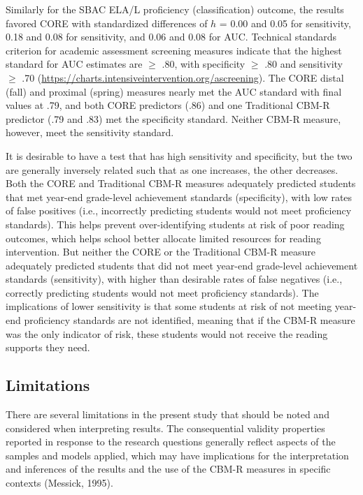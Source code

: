 \documentclass[
  english,
  man, fleqn, noextraspace]{apa6}
\begin{document}
Similarly for the SBAC ELA/L proficiency (classification) outcome, the results favored CORE with standardized differences of \(h\) = 0.00 and 0.05 for sensitivity, 0.18 and 0.08 for sensitivity, and 0.06 and 0.08 for AUC. Technical standards criterion for academic assessment screening measures indicate that the highest standard for AUC estimates are \(\geq\) .80, with specificity \(\geq\) .80 and sensitivity \(\geq\) .70 (\url{https://charts.intensiveintervention.org/ascreening}). The CORE distal (fall) and proximal (spring) measures nearly met the AUC standard with final values at .79, and both CORE predictors (.86) and one Traditional CBM-R predictor (.79 and .83) met the specificity standard. Neither CBM-R measure, however, meet the sensitivity standard.

It is desirable to have a test that has high sensitivity and specificity, but the two are generally inversely related such that as one increases, the other decreases. Both the CORE and Traditional CBM-R measures adequately predicted students that met year-end grade-level achievement standards (specificity), with low rates of false positives (i.e., incorrectly predicting students would not meet proficiency standards). This helps prevent over-identifying students at risk of poor reading outcomes, which helps school better allocate limited resources for reading intervention. But neither the CORE or the Traditional CBM-R measure adequately predicted students that did not meet year-end grade-level achievement standards (sensitivity), with higher than desirable rates of false negatives (i.e., correctly predicting students would not meet proficiency standards). The implications of lower sensitivity is that some students at risk of not meeting year-end proficiency standards are not identified, meaning that if the CBM-R measure was the only indicator of risk, these students would not receive the reading supports they need.

\hypertarget{limitations}{%
\subsection{Limitations}\label{limitations}}

There are several limitations in the present study that should be noted and considered when interpreting results. The consequential validity properties reported in response to the research questions generally reflect aspects of the samples and models applied, which may have implications for the interpretation and inferences of the results and the use of the CBM-R measures in specific contexts (Messick, 1995).
\end{document}
